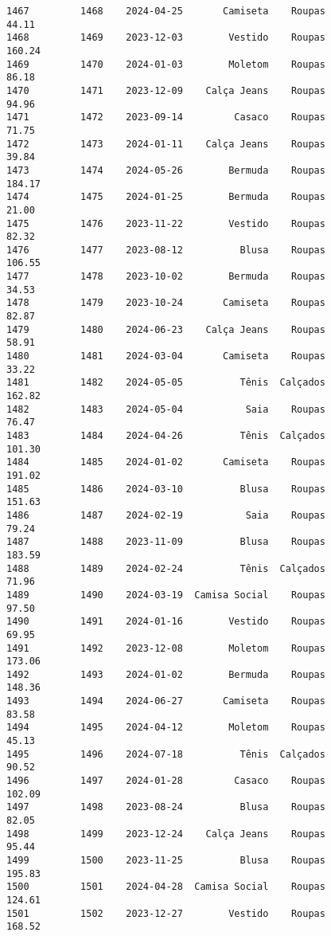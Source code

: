 \documentclass[11pt]{article}
\begin{document}
\begin{Verbatim}[commandchars=\\\{\}]
1467         1468    2024-04-25       Camiseta    Roupas           44.11   
1468         1469    2023-12-03        Vestido    Roupas          160.24   
1469         1470    2024-01-03        Moletom    Roupas           86.18   
1470         1471    2023-12-09    Calça Jeans    Roupas           94.96   
1471         1472    2023-09-14         Casaco    Roupas           71.75   
1472         1473    2024-01-11    Calça Jeans    Roupas           39.84   
1473         1474    2024-05-26        Bermuda    Roupas          184.17   
1474         1475    2024-01-25        Bermuda    Roupas           21.00   
1475         1476    2023-11-22        Vestido    Roupas           82.32   
1476         1477    2023-08-12          Blusa    Roupas          106.55   
1477         1478    2023-10-02        Bermuda    Roupas           34.53   
1478         1479    2023-10-24       Camiseta    Roupas           82.87   
1479         1480    2024-06-23    Calça Jeans    Roupas           58.91   
1480         1481    2024-03-04       Camiseta    Roupas           33.22   
1481         1482    2024-05-05          Tênis  Calçados          162.82   
1482         1483    2024-05-04           Saia    Roupas           76.47   
1483         1484    2024-04-26          Tênis  Calçados          101.30   
1484         1485    2024-01-02       Camiseta    Roupas          191.02   
1485         1486    2024-03-10          Blusa    Roupas          151.63   
1486         1487    2024-02-19           Saia    Roupas           79.24   
1487         1488    2023-11-09          Blusa    Roupas          183.59   
1488         1489    2024-02-24          Tênis  Calçados           71.96   
1489         1490    2024-03-19  Camisa Social    Roupas           97.50   
1490         1491    2024-01-16        Vestido    Roupas           69.95   
1491         1492    2023-12-08        Moletom    Roupas          173.06   
1492         1493    2024-01-02        Bermuda    Roupas          148.36   
1493         1494    2024-06-27       Camiseta    Roupas           83.58   
1494         1495    2024-04-12        Moletom    Roupas           45.13   
1495         1496    2024-07-18          Tênis  Calçados           90.52   
1496         1497    2024-01-28         Casaco    Roupas          102.09   
1497         1498    2023-08-24          Blusa    Roupas           82.05   
1498         1499    2023-12-24    Calça Jeans    Roupas           95.44   
1499         1500    2023-11-25          Blusa    Roupas          195.83   
1500         1501    2024-04-28  Camisa Social    Roupas          124.61   
1501         1502    2023-12-27        Vestido    Roupas          168.52   

\end{Verbatim}
\end{document}
